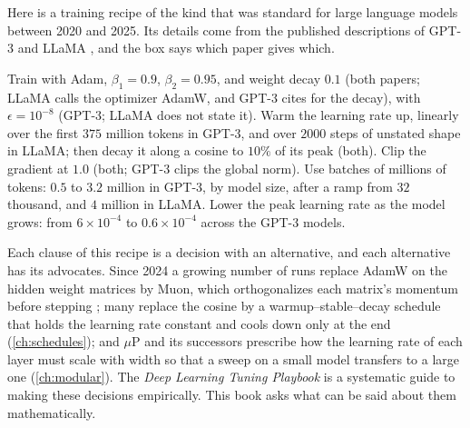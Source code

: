 \begin{refsection}

Here is a training recipe of the kind that was standard for large language models between 2020 and 2025. Its details come from the published descriptions of GPT-3 \parencite{BrownEtAl2020} and LLaMA \parencite{TouvronEtAl2023}, and the box says which paper gives which.

\begin{practice}
Train with Adam, $\beta_1=0.9$, $\beta_2=0.95$, and weight decay $0.1$ (both papers; LLaMA calls the optimizer AdamW, and GPT-3 cites \textcite{LoshchilovHutter2019} for the decay), with $\epsilon=10^{-8}$ (GPT-3; LLaMA does not state it). Warm the learning rate up, linearly over the first $375$ million tokens in GPT-3, and over $2000$ steps of unstated shape in LLaMA; then decay it along a cosine to $10\%$ of its peak (both). Clip the gradient at $1.0$ (both; GPT-3 clips the global norm). Use batches of millions of tokens: $0.5$ to $3.2$ million in GPT-3, by model size, after a ramp from $32$ thousand, and $4$ million in LLaMA. Lower the peak learning rate as the model grows: from $6\times10^{-4}$ to $0.6\times10^{-4}$ across the GPT-3 models.
\end{practice}

Each clause of this recipe is a decision with an alternative, and each alternative has its advocates. Since 2024 a growing number of runs replace AdamW on the hidden weight matrices by Muon, which orthogonalizes each matrix's momentum before stepping \parencite{JordanEtAl2024Muon,LiuEtAl2025Muon}; many replace the cosine by a warmup--stable--decay schedule that holds the learning rate constant and cools down only at the end (\cref{ch:schedules}); and $\mu$P and its successors prescribe how the learning rate of each layer must scale with width so that a sweep on a small model transfers to a large one (\cref{ch:modular}). The \emph{Deep Learning Tuning Playbook} \parencite{GodboleEtAl2023} is a systematic guide to making these decisions empirically. This book asks what can be said about them mathematically.


\end{refsection}
